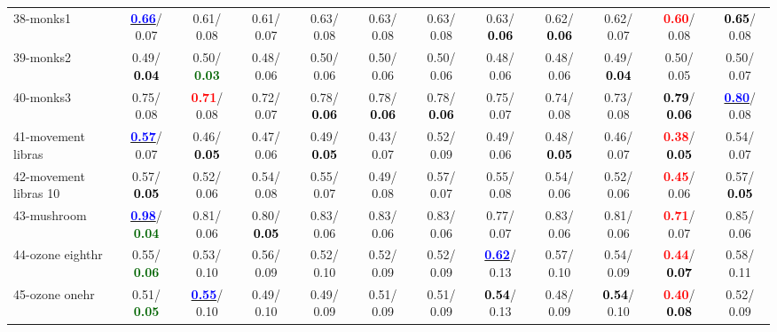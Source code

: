 \begin{table}[h]
\begin{center}
{\begin{tabular}{lc|c|c|c|c|c|c|c|c|c|c}
38-monks1 & \underline{\textcolor{blue}{\textbf{  0.66}}}/  0.07 &   0.61/  0.08 &   0.61/  0.07 &   0.63/  0.08 &   0.63/  0.08 &   0.63/  0.08 &   0.63/\textcolor{black}{\textbf{  0.06}} &   0.62/\textcolor{black}{\textbf{  0.06}} &   0.62/  0.07 & \textcolor{red}{\textbf{  0.60}}/  0.08 & \textcolor{black}{\textbf{  0.65}}/  0.08 \\
39-monks2 &   0.49/\textcolor{black}{\textbf{  0.04}} &   0.50/\textcolor{darkgreen}{\textbf{  0.03}} &   0.48/  0.06 &   0.50/  0.06 &   0.50/  0.06 &   0.50/  0.06 &   0.48/  0.06 &   0.48/  0.06 &   0.49/\textcolor{black}{\textbf{  0.04}} &   0.50/  0.05 &   0.50/  0.07 \\ \hline
40-monks3 &   0.75/  0.08 & \textcolor{red}{\textbf{  0.71}}/  0.08 &   0.72/  0.07 &   0.78/\textcolor{black}{\textbf{  0.06}} &   0.78/\textcolor{black}{\textbf{  0.06}} &   0.78/\textcolor{black}{\textbf{  0.06}} &   0.75/  0.07 &   0.74/  0.08 &   0.73/  0.08 & \textcolor{black}{\textbf{  0.79}}/\textcolor{black}{\textbf{  0.06}} & \underline{\textcolor{blue}{\textbf{  0.80}}}/  0.08 \\
41-movement libras & \underline{\textcolor{blue}{\textbf{  0.57}}}/  0.07 &   0.46/\textcolor{black}{\textbf{  0.05}} &   0.47/  0.06 &   0.49/\textcolor{black}{\textbf{  0.05}} &   0.43/  0.07 &   0.52/  0.09 &   0.49/  0.06 &   0.48/\textcolor{black}{\textbf{  0.05}} &   0.46/  0.07 & \textcolor{red}{\textbf{  0.38}}/\textcolor{black}{\textbf{  0.05}} &   0.54/  0.07 \\
42-movement libras 10 &   0.57/\textcolor{black}{\textbf{  0.05}} &   0.52/  0.06 &   0.54/  0.08 &   0.55/  0.07 &   0.49/  0.08 &   0.57/  0.07 &   0.55/  0.08 &   0.54/  0.06 &   0.52/  0.06 & \textcolor{red}{\textbf{  0.45}}/  0.06 &   0.57/\textcolor{black}{\textbf{  0.05}} \\
43-mushroom & \underline{\textcolor{blue}{\textbf{  0.98}}}/\textcolor{darkgreen}{\textbf{  0.04}} &   0.81/  0.06 &   0.80/\textcolor{black}{\textbf{  0.05}} &   0.83/  0.06 &   0.83/  0.06 &   0.83/  0.06 &   0.77/  0.07 &   0.83/  0.06 &   0.81/  0.06 & \textcolor{red}{\textbf{  0.71}}/  0.07 &   0.85/  0.06 \\
44-ozone eighthr &   0.55/\textcolor{darkgreen}{\textbf{  0.06}} &   0.53/  0.10 &   0.56/  0.09 &   0.52/  0.10 &   0.52/  0.09 &   0.52/  0.09 & \underline{\textcolor{blue}{\textbf{  0.62}}}/  0.13 &   0.57/  0.10 &   0.54/  0.09 & \textcolor{red}{\textbf{  0.44}}/\textcolor{black}{\textbf{  0.07}} &   0.58/  0.11 \\
45-ozone onehr &   0.51/\textcolor{darkgreen}{\textbf{  0.05}} & \underline{\textcolor{blue}{\textbf{  0.55}}}/  0.10 &   0.49/  0.10 &   0.49/  0.09 &   0.51/  0.09 &   0.51/  0.09 & \textcolor{black}{\textbf{  0.54}}/  0.13 &   0.48/  0.09 & \textcolor{black}{\textbf{  0.54}}/  0.10 & \textcolor{red}{\textbf{  0.40}}/\textcolor{black}{\textbf{  0.08}} &   0.52/  0.09 \\

\end{tabular}}
\end{center}
\end{table}
